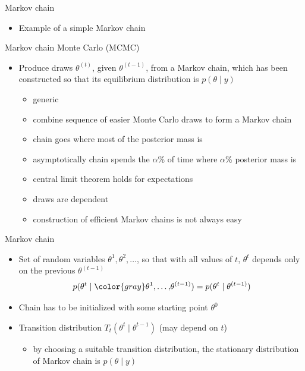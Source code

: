 \documentclass[finnish,english,t]{beamer}
\begin{document}
\begin{frame}{Markov chain}

  \begin{itemize}
  \item Example of a simple Markov chain
  \end{itemize}

\end{frame}  

  
\begin{frame}{Markov chain Monte Carlo (MCMC)}

  \begin{itemize}
  \item Produce draws $\theta^{(t)}$, given $\theta^{(t-1)}$, from a
    Markov chain, which has been constructed so that its equilibrium
    distribution is $p(\theta \mid y)$
    \begin{itemize}
    \item<2->[+] generic
    \item<2->[+] combine sequence of easier Monte Carlo draws to form a Markov chain
    \item<3->[+] chain goes where most of the posterior mass is
    \item<3->[+] asymptotically chain spends the $\alpha$\% of time where
      $\alpha$\% posterior mass is
    \item<4->[+] central limit theorem holds for expectations 
    \item<5->[-] draws are dependent
    \item<5->[-] construction of efficient Markov chains is not always
      easy
    \end{itemize}
\end{itemize}

\end{frame}

\begin{frame}{Markov chain}

  \begin{itemize}
  \item Set of random variables $\theta^1,\theta^2,\ldots$, so that
    with all values of $t$, $\theta^t$ depends only on the previous $\theta^{(t-1)}$
    \begin{equation*}
      p(\theta^t \mid {\color{gray}\theta^1,\ldots,}\theta^{(t-1)})=p(\theta^t \mid \theta^{(t-1)})
    \end{equation*}
  \item<2-> Chain has to be initialized with some starting point $\theta^0$
  \item<3-> Transition distribution $T_t(\theta^t \mid \theta^{t-1})$ (may
    depend on $t$)
    \begin{itemize}
    \item by choosing a suitable transition distribution, the
      stationary distribution of Markov chain is $p(\theta \mid y)$
    \end{itemize}
  \end{itemize}

\end{frame}
\end{document}
